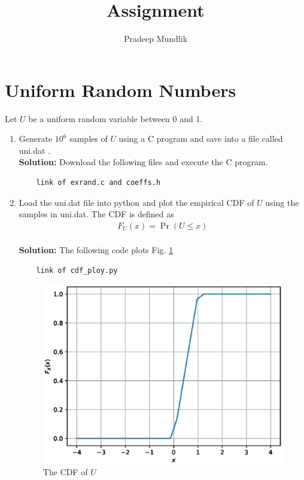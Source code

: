 \documentclass[journal,12pt,twocolumn]{IEEEtran}
\renewcommand\thesection{\arabic{section}}
\providecommand{\pr}[1]{\ensuremath{\Pr\left(#1\right)}}
\theoremstyle{remark}
\newcommand{\solution}{\noindent \textbf{Solution: }}
\numberwithin{equation}{section}
\begin{document}
\author{Pradeep Mundlik}%
\title{Assignment}
\maketitle
\tableofcontents
\bigskip

\section{Uniform Random Numbers}
Let $U$ be a uniform random variable between 0 and 1.
\begin{enumerate}[label=\thesection.\arabic*
,ref=\thesection.\theenumi]
\item Generate $10^6$ samples of $U$ using a C program and save into a file called uni.dat .
\\
\solution Download the following files and execute the  C program.
\begin{lstlisting}
	link of exrand.c and coeffs.h
\end{lstlisting}

%
\item
Load the uni.dat file into python and plot the empirical CDF of $U$ using the samples in uni.dat. The CDF is defined as
\begin{align}
F_{U}(x) = \pr{U \le x}
\end{align}
\\
\solution  The following code plots Fig. \ref{fig:uni_cdf}
\begin{lstlisting}
	link of cdf_ploy.py
\end{lstlisting}
\begin{figure}[h]
\centering
\includegraphics[width=\columnwidth]{figs/1/uni_cdf.eps}
\caption{The CDF of $U$}
\label{fig:uni_cdf}
\end{figure}


\end{enumerate}
\end{document}
